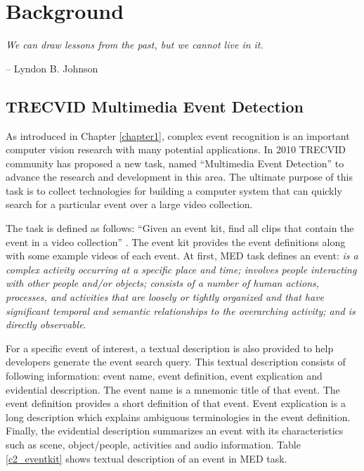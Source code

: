 \chapter{Background}
\label{chapter2}
\epigraph{\textit{We can draw lessons from the past, but we cannot live in it.}}{ -- Lyndon B. Johnson}

\ifpdf
    \graphicspath{{Chapter2/Figs/Raster/}{Chapter2/Figs/PDF/}{Chapter2/Figs/}}
\else
    \graphicspath{{Chapter2/Figs/Vector/}{Chapter2/Figs/}}
\fi


\section{TRECVID Multimedia Event Detection}

As introduced in Chapter \ref{chapter1}, complex event recognition is an important computer vision research with many potential applications. In 2010 TRECVID community has proposed a new task, named ``Multimedia Event Detection'' to advance the research and development in this area. The ultimate purpose of this task is to collect technologies for building a computer system that can quickly search for a particular event over a large video collection.  
 
The task is defined as follows: ``Given an event kit, find all clips that contain the event in a video collection'' \cite{over2011trecvid}. The event kit provides the event definitions along with some example videos of each event. At first, MED task defines an event:\textit{ is a complex activity occurring at a specific place and time; involves people interacting with other people and/or objects; consists of a number of human actions, processes, and activities that are loosely or tightly organized and that have significant temporal and semantic relationships to the overarching activity; and is directly observable}. 

For a specific event of interest, a textual description is also provided to help developers generate the event search query. This textual description consists of following information: event name, event definition, event explication and evidential description. The event name is a mnemonic title of that event. The event definition provides a short definition of that event. Event explication is a long description which explains ambiguous terminologies in the event definition. Finally, the evidential description summarizes an event with its characteristics such as scene, object/people, activities and audio information. Table \ref{c2_eventkit} shows textual description of an event in MED task.

